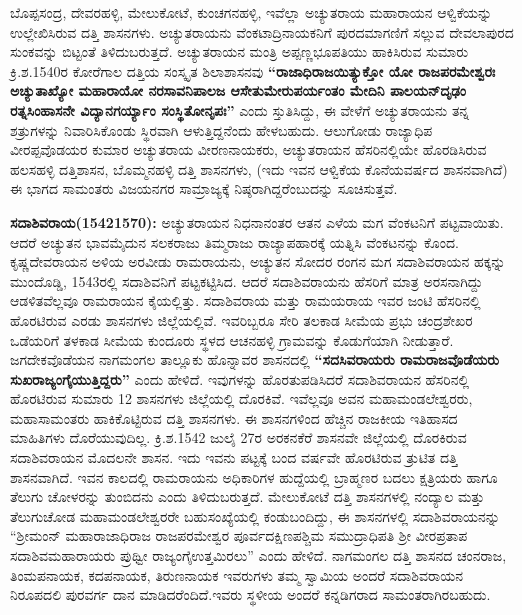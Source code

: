 ಬೊಪ್ಪಸಂದ್ರ, ದೇವರಹಳ್ಳಿ, ಮೇಲುಕೋಟೆ, ಕುಂಚಗನಹಳ್ಳಿ, ಇವೆಲ್ಲಾ ಅಚ್ಯುತರಾಯ ಮಹಾರಾಯನ ಆಳ್ವಿಕೆಯನ್ನು ಉಲ್ಲೇಖಿಸಿರುವ ದತ್ತಿ ಶಾಸನಗಳು. ಅಚ್ಯುತರಾಯನು ವೆಂಕಟಾದ್ರಿನಾಯಕನಿಗೆ ಪುರದಮಾಗಣಿಗೆ ಸಲ್ಲುವ ದೇವಲಾಪುರದ ಸುಂಕವನ್ನು ಬಿಟ್ಟಂತೆ ತಿಳಿದುಬರುತ್ತದೆ. ಅಚ್ಯುತರಾಯನ ಮಂತ್ರಿ ಅಪ್ಪಣ್ಣಭೂಪತಿಯು ಹಾಕಿಸಿರುವ ಸುಮಾರು ಕ್ರಿ.ಶ.1540ರ ಕೋರೆಗಾಲ ದತ್ತಿಯ ಸಂಸ್ಕೃತ ಶಿಲಾಶಾಸನವು \textbf{“ರಾಜಾಧಿರಾಜಯಿತ್ಯುಕ್ತೋ ಯೋ ರಾಜಪರಮೇಶ್ವರಃ ಅಚ್ಯುತಾಖ್ಯೋ ಮಹಾರಾಯೋ ನರಸಾವನಿಪಾಲಜ ಆಸೇತುಮೇರುಪರ್ಯಂತಂ ಮೇದಿನಿ ಪಾಲಯನ್​ ದೃಢಂ ರತ್ನಸಿಂಹಾಸನೇ ವಿದ್ಯಾನಗರ್ಯ್ಯಾಂ ಸಂಸ್ಥಿತೋನೃಪಃ” }ಎಂದು ಸ್ತುತಿಸಿದ್ದು, ಈ ವೇಳೆಗೆ ಅಚ್ಯುತರಾಯನು ತನ್ನ ಶತ್ರುಗಳನ್ನು ನಿವಾರಿಸಿಕೊಂಡು ಸ್ಥಿರವಾಗಿ ಆಳುತ್ತಿದ್ದನೆಂದು ಹೇಳಬಹುದು. ಆಲುಗೋಡು ರಾಜ್ಯಾಧಿಪ ವೀರಪ್ಪವೊಡಯರ ಕುಮಾರ ಅಚ್ಯುತರಾಯ ವೀರಣನಾಯಕರು, ಅಚ್ಯುತರಾಯನ ಹೆಸರಿನಲ್ಲಿಯೇ ಹೊರಡಿಸಿರುವ ಹಲಸಹಳ್ಳಿ ದತ್ತಿಶಾಸನ, ಬೊಮ್ಮನಹಳ್ಳಿ ದತ್ತಿ ಶಾಸನಗಳು, (ಇದು ಇವನ ಆಳ್ವಿಕೆಯ ಕೊನೆಯವರ್ಷದ ಶಾಸನವಾಗಿದೆ) ಈ ಭಾಗದ ಸಾಮಂತರು ವಿಜಯನಗರ ಸಾಮ್ರಾಜ್ಯಕ್ಕೆ ನಿಷ್ಠರಾಗಿದ್ದರೆಂಬುದನ್ನು ಸೂಚಿಸುತ್ತವೆ.

\textbf{ಸದಾಶಿವರಾಯ(1542\general{\enginline{-}}1570):} ಅಚ್ಯುತರಾಯನ ನಿಧನಾನಂತರ ಆತನ ಎಳೆಯ ಮಗ ವೆಂಕಟನಿಗೆ ಪಟ್ಟವಾಯಿತು. ಆದರೆ ಅಚ್ಯುತನ ಭಾವಮೈದುನ ಸಲಕರಾಜು ತಿಮ್ಮರಾಜು ರಾಜ್ಯಾಪಹಾರಕ್ಕೆ ಯತ್ನಿಸಿ ವೆಂಕಟನನ್ನು ಕೊಂದ. ಕೃಷ್ಣದೇವರಾಯನ ಅಳಿಯ ಅರವೀಡು ರಾಮರಾಯನು, ಅಚ್ಯುತನ ಸೋದರ ರಂಗನ ಮಗ ಸದಾಶಿವರಾಯನ ಹಕ್ಕನ್ನು ಮುಂದೊಡ್ಡಿ, 1543ರಲ್ಲಿ ಸದಾಶಿವನಿಗೆ ಪಟ್ಟಕಟ್ಟಿಸಿದ. ಆದರೆ ಸದಾಶಿವರಾಯನು ಹೆಸರಿಗೆ ಮಾತ್ರ ಅರಸನಾಗಿದ್ದು ಆಡಳಿತವೆಲ್ಲವೂ ರಾಮರಾಯನ ಕೈಯಲ್ಲಿತ್ತು. ಸದಾಶಿವರಾಯ ಮತ್ತು ರಾಮಯರಾಯ ಇವರ ಜಂಟಿ ಹೆಸರಿನಲ್ಲಿ ಹೊರಟಿರುವ ಎರಡು ಶಾಸನಗಳು ಜಿಲ್ಲೆಯಲ್ಲಿವೆ. ಇವರಿಬ್ಬರೂ ಸೇರಿ ತಲಕಾಡ ಸೀಮೆಯ ಪ್ರಭು ಚಂದ್ರಶೇಖರ ಒಡೆಯರಿಗೆ ತಳಕಾಡ ಸೀಮೆಯ ಕುಂದೂರು ಸ್ಥಳದ ಆಚನಹಳ್ಳಿ ಗ್ರಾಮವನ್ನು ಕೊಡುಗೆಯಾಗಿ ನೀಡುತ್ತಾರೆ. ಜಗದೇಕವೊಡೆಯನ ನಾಗಮಂಗಲ ತಾಲ್ಲೂಕು ಹೊನ್ನಾವರ ಶಾಸನದಲ್ಲಿ \textbf{“ಸದಸಿವರಾಯರು ರಾಮರಾಜವೊಡೆಯರು ಸುಖರಾಜ್ಯಂಗೈಯುತ್ತಿದ್ದರು” }ಎಂದು ಹೇಳಿದೆ. ಇವುಗಳನ್ನು ಹೊರತುಪಡಿಸಿದರೆ ಸದಾಶಿವರಾಯನ ಹೆಸರಿನಲ್ಲಿ ಹೊರಟಿರುವ ಸುಮಾರು 12 ಶಾಸನಗಳು ಜಿಲ್ಲೆಯಲ್ಲಿ ದೊರಕಿವೆ. ಇವೆಲ್ಲವೂ ಅವನ ಮಹಾಮಂಡಲೇಶ್ವರರು, ಮಹಾಸಾಮಂತರು ಹಾಕಿಕೊಟ್ಟಿರುವ ದತ್ತಿ ಶಾಸನಗಳು. ಈ ಶಾಸನಗಳಿಂದ ಹೆಚ್ಚಿನ ರಾಜಕೀಯ ಇತಿಹಾಸದ ಮಾಹಿತಿಗಳು ದೊರೆಯುವುದಿಲ್ಲ. ಕ್ರಿ.ಶ.1542 ಜುಲೈ 27ರ ಅರಕನಕೆರೆ ಶಾಸನವೇ ಜಿಲ್ಲೆಯಲ್ಲಿ ದೊರಕಿರುವ ಸದಾಶಿವರಾಯನ ಮೊದಲನೇ ಶಾಸನ. ಇದು ಇವನು ಪಟ್ಟಕ್ಕೆ ಬಂದ ವರ್ಷವೇ ಹೊರಟಿರುವ ತ್ರುಟಿತ ದತ್ತಿ ಶಾಸನವಾಗಿದೆ. ಇವನ ಕಾಲದಲ್ಲಿ ರಾಮರಾಯನು ಅಧಿಕಾರಿಗಳ ಹುದ್ದೆಯಲ್ಲಿ ಬ್ರಾಹ್ಮಣರ ಬದಲು ಕ್ಷತ್ರಿಯರು ಹಾಗೂ ತೆಲುಗು ಚೋಳರನ್ನು ತುಂಬಿದನು ಎಂದು ತಿಳಿದುಬರುತ್ತದೆ. ಮೇಲುಕೋಟೆ ದತ್ತಿ ಶಾಸನಗಳಲ್ಲಿ ನಂದ್ಯಾಲ ಮತ್ತು ತೆಲುಗುಚೋಡ ಮಹಾಮಂಡಲೇಶ್ವರರೇ ಬಹುಸಂಖ್ಯೆಯಲ್ಲಿ ಕಂಡುಬಂದಿದ್ದು, ಈ ಶಾಸನಗಳಲ್ಲಿ ಸದಾಶಿವರಾಯನನ್ನು “ಶ‍್ರೀಮಂನ್​ ಮಹಾರಾಜಾಧಿರಾಜ ರಾಜಪರಮೇಶ್ವರ ಪೂರ್ವದಕ್ಷಿಣಪಶ್ಚಿಮ ಸಮುದ್ರಾಧಿಪತಿ ಶ‍್ರೀ ವೀರಪ್ರತಾಪ ಸದಾಶಿವಮಹಾರಾಯರು ಪ್ರುಥ್ವೀ ರಾಜ್ಯಂಗೈಉತ್ತಮಿರಲು” ಎಂದು ಹೇಳಿದೆ. ನಾಗಮಂಗಲ ದತ್ತಿ ಶಾಸನದ ಚಂನರಾಜ, ತಿಂಮಪನಾಯಕ, ಕದಪನಾಯಕ, ತಿರುಣನಾಯಕ ಇವರುಗಳು ತಮ್ಮ ಸ್ವಾಮಿಯ ಅಂದರೆ ಸದಾಶಿವರಾಯನ ನಿರೂಪದಲಿ ಪುರವರ್ಗ ದಾನ ಮಾಡಿದರೆಂದಿದೆ.ಇವರು ಸ್ಥಳೀಯ ಅಂದರೆ ಕನ್ನಡಿಗರಾದ ಸಾಮಂತರಾಗಿರಬಹುದು.

